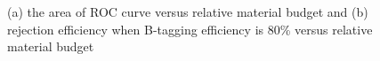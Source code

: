 \documentclass[usetikz]{style/cepcnote}
\begin{document}
\begin{figure}[!ht]
	\centering
	\caption{(a) the area of ROC curve versus relative material budget and (b) rejection efficiency when B-tagging efficiency is 80\% versus relative material budget}
	\label{fig:BROC_area}
\end{figure}
\end{document}
